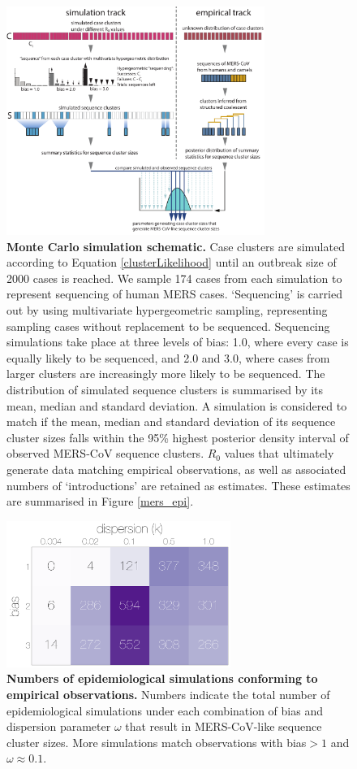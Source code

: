 \documentclass[9pt,lineno]{elife}
\begin{document}
\begin{figure}[h]
\centering
	\includegraphics[width=0.75\textwidth]{figures/mers_mc_method.pdf}
	\caption{\textbf{Monte Carlo simulation schematic.}
Case clusters are simulated according to Equation \ref{clusterLikelihood} until an outbreak size of 2000 cases is reached.
We sample 174 cases from each simulation to represent sequencing of human MERS cases.
`Sequencing' is carried out by using multivariate hypergeometric sampling, representing sampling cases without replacement to be sequenced.
Sequencing simulations take place at three levels of bias: 1.0, where every case is equally likely to be sequenced, and 2.0 and 3.0, where cases from larger clusters are increasingly more likely to be sequenced.
The distribution of simulated sequence clusters is summarised by its mean, median and standard deviation.
A simulation is considered to match if the mean, median and standard deviation of its sequence cluster sizes falls within the 95\% highest posterior density interval of observed MERS-CoV sequence clusters.
$R_{0}$ values that ultimately generate data matching empirical observations, as well as associated numbers of `introductions' are retained as estimates.
These estimates are summarised in Figure \ref{mers_epi}.
	}
	\label{mc_method}
\end{figure}

\begin{figure}[h]
\centering
	\includegraphics[width=0.65\textwidth]{figures/mers_simMarginals.png}
	\caption{\textbf{Numbers of epidemiological simulations conforming to empirical observations.}
Numbers indicate the total number of epidemiological simulations under each combination of bias and dispersion parameter $\omega$ that result in MERS-CoV-like sequence cluster sizes.
More simulations match observations with bias$>1$ and $\omega \approx 0.1$.
	}
	\label{marginals}
\end{figure}
\end{document}

